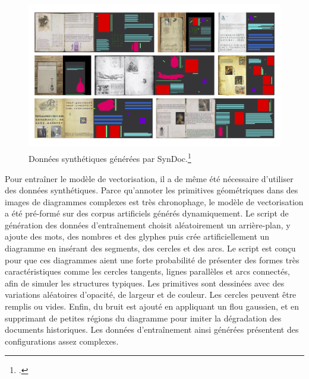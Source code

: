           \begin{figure}[H]
          \begin{center}
          \includegraphics[height=6.5cm]{figues/syndoc.jpg}
          \end{center}
          \caption{Données synthétiques générées par SynDoc.\footcite[p.46]{norindr_traitement_2023}}
          \label{fig:syndoc} \end{figure}

Pour entraîner le modèle de vectorisation, il a de même été nécessaire
d'utiliser des données synthétiques. Parce qu'annoter les primitives
géométriques dans des images de diagrammes complexes est très
chronophage, le modèle de vectorisation a été pré-formé sur des corpus
artificiels générés dynamiquement. Le script de génération des données
d'entraînement choisit aléatoirement un arrière-plan, y ajoute des mots,
des nombres et des glyphes puis crée artificiellement un diagramme en
insérant des segments, des cercles et des arcs. Le script est conçu pour
que ces diagrammes aient une forte probabilité de présenter des formes
très caractéristiques comme les cercles tangents,
lignes parallèles et arcs connectés, afin de simuler les structures
typiques. Les primitives sont dessinées avec des
variations aléatoires d'opacité, de largeur et de couleur. Les cercles
peuvent être remplis ou vides. Enfin, du bruit est ajouté en appliquant
un flou gaussien, et en supprimant de petites régions du diagramme pour
imiter la dégradation des documents historiques. Les données
d'entraînement ainsi générées présentent des configurations assez
complexes.

